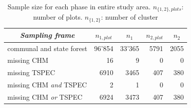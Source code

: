 \begin{table}[H]
	\begin{center}
		\caption{Sample size for each phase in entire study area. $n_{\{1,2\},plots}$: number of plots. $n_{\{1,2\}}$: number of cluster}
		\vspace{0.2cm}
		\label{tab:ssize}
		{\small %
		\begin{tabular}{l|r|r|r|r}
			\hline
			\multicolumn{1}{c|}{\textit{Sampling frame}} & \multicolumn{1}{c|}{\textbf{$n_{1,plot}$}}  & \multicolumn{1}{c|}{\textbf{$n_1$}}  & \multicolumn{1}{c|}{\textbf{$n_{2,plot}$}}  & \multicolumn{1}{c}{\textbf{$n_2$}} \\ %
			\hline \hline
			communal and state forest & 96'854 & 33'365 & 5791 & 2055\\ %
			\hspace{5mm} \footnotesize missing CHM & \footnotesize 16 & \footnotesize 9 & \footnotesize 0 & \footnotesize 0\\ %
			\hspace{5mm} \footnotesize missing TSPEC & \footnotesize 6910  & \footnotesize 3465 & \footnotesize 407 & \footnotesize 380\\ %
			\hspace{5mm} \footnotesize missing CHM \textit{and} TSPEC & \footnotesize 2 & \footnotesize 1 & \footnotesize 0 & \footnotesize 0\\ %
			\hspace{5mm} \footnotesize missing CHM \textit{or} TSPEC & \footnotesize 6924 & \footnotesize 3473 & \footnotesize 407 & \footnotesize 380\\ %
			\hline \hline
		\end{tabular}
	} %
	\end{center}
\end{table}


